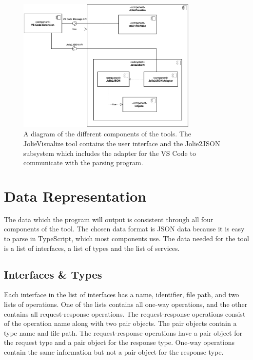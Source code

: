 \begin{figure}[t]
    \center
    \includegraphics[width=0.80\textwidth]{figures/component_diagram.png}
    \caption{A diagram of the different components of the tools. The JolieVisualize tool contains the user interface and the Jolie2JSON subsystem which includes the adapter for the VS Code to communicate with the parsing program.}
    \label{figure:comp_diagram}
\end{figure}

\section{Data Representation}
The data which the \javatoolname[] program will output is consistent through all
four components of the tool. The chosen data format is JSON data because it is easy to parse in TypeScript, which most components use.
The data needed for the tool is a list of interfaces, a list of types and the list of services.

\subsection{Interfaces \& Types}
Each interface in the list of interfaces has a name, identifier, file path, and two lists of operations.
One of the lists contains all one-way operations, and the other contains all request-response operations.
The request-response operations consist of the operation name along with two pair objects. The pair objects contain a type name and file path.
The request-response operations have a pair object for the request type and a pair object for the response type.
One-way operations contain the same information but not a pair object for the response type.

